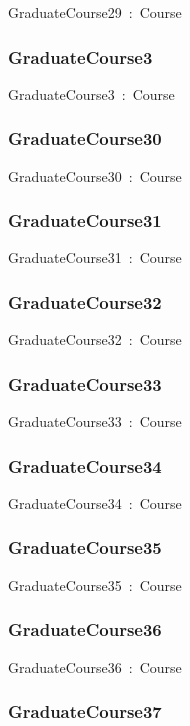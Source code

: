 \documentclass{article}
\begin{document}
GraduateCourse29~:~Course

\subsubsection*{GraduateCourse3}

GraduateCourse3~:~Course

\subsubsection*{GraduateCourse30}

GraduateCourse30~:~Course

\subsubsection*{GraduateCourse31}

GraduateCourse31~:~Course

\subsubsection*{GraduateCourse32}

GraduateCourse32~:~Course

\subsubsection*{GraduateCourse33}

GraduateCourse33~:~Course

\subsubsection*{GraduateCourse34}

GraduateCourse34~:~Course

\subsubsection*{GraduateCourse35}

GraduateCourse35~:~Course

\subsubsection*{GraduateCourse36}

GraduateCourse36~:~Course

\subsubsection*{GraduateCourse37}
\end{document}
